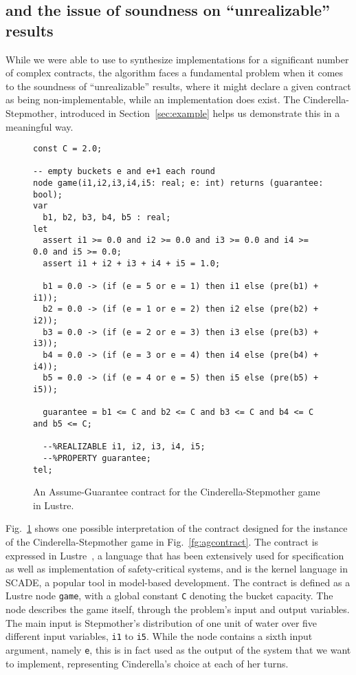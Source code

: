 \subsection{\jsyn and the issue of soundness on ``unrealizable'' results}

While we were able to use \jsyn to synthesize implementations for a significant number of complex contracts, the algorithm faces a fundamental problem when it comes to the soundness of ``unrealizable'' results, where it might declare a given contract as being non-implementable, while an implementation does exist. The Cinderella-Stepmother, introduced in Section~\ref{sec:example} helps us demonstrate this in a meaningful way.

\begin{figure}[!t]
\centering
 \begin{Verbatim}[fontsize=\scriptsize]
const C = 2.0;

-- empty buckets e and e+1 each round
node game(i1,i2,i3,i4,i5: real; e: int) returns (guarantee: bool);
var
  b1, b2, b3, b4, b5 : real;
let
  assert i1 >= 0.0 and i2 >= 0.0 and i3 >= 0.0 and i4 >= 0.0 and i5 >= 0.0;
  assert i1 + i2 + i3 + i4 + i5 = 1.0;

  b1 = 0.0 -> (if (e = 5 or e = 1) then i1 else (pre(b1) + i1));
  b2 = 0.0 -> (if (e = 1 or e = 2) then i2 else (pre(b2) + i2));
  b3 = 0.0 -> (if (e = 2 or e = 3) then i3 else (pre(b3) + i3));
  b4 = 0.0 -> (if (e = 3 or e = 4) then i4 else (pre(b4) + i4));
  b5 = 0.0 -> (if (e = 4 or e = 5) then i5 else (pre(b5) + i5));

  guarantee = b1 <= C and b2 <= C and b3 <= C and b4 <= C and b5 <= C;

  --%REALIZABLE i1, i2, i3, i4, i5;
  --%PROPERTY guarantee;
tel;
 \end{Verbatim}
\vspace{-1em}
\caption{An Assume-Guarantee contract for the Cinderella-Stepmother game in Lustre.}

\label{fg:cind}
\end{figure}

Fig.~\ref{fg:cind} shows one possible interpretation of the contract designed
for the instance of the Cinderella-Stepmother game in Fig.~\ref{fg:agcontract}. The contract
is expressed in Lustre~\cite{lustrev6}, a language
that has been extensively used for specification as well as implementation of
safety-critical systems, and is the kernel language in SCADE, a popular tool in
model-based development. The contract is defined as a Lustre node \texttt{game}, with a global
constant \texttt{C} denoting the bucket capacity. The node describes the game itself,
through the problem's input and output variables. The main input is Stepmother's
distribution of one unit of water over five different input variables,
\texttt{i1} to \texttt{i5}. While the node contains a sixth input argument,
namely \texttt{e}, this is in fact used as the output of the system that we want to
implement, representing Cinderella's choice at each of her turns.

